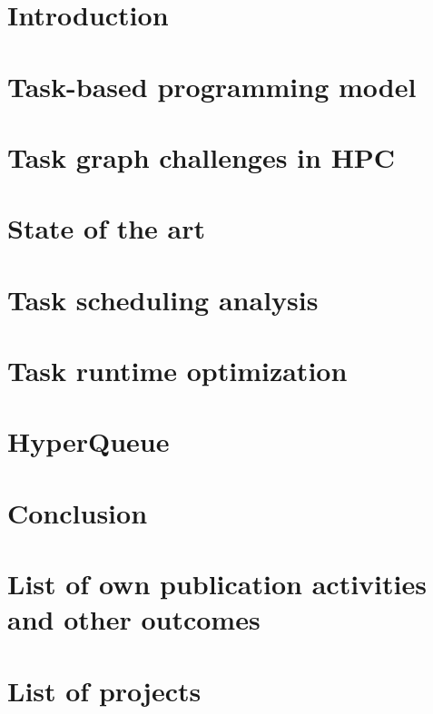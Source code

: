 \documentclass[english,phd]{diploma}
\begin{document}
\MakeTitlePages

\listoffigures
\clearpage

\listoftables
\clearpage

\nocite{estee, rsds, ligate}

\chapter{Introduction}
\label{ch:Introduction}


\chapter{Task-based programming model}
\label{ch:taskgraphs}


\chapter{Task graph challenges in HPC}
\label{ch:challenges}


\chapter{State of the art}
\label{ch:sota}


\chapter{Task scheduling analysis}
\label{ch:estee}


\chapter{Task runtime optimization}
\label{ch:rsds}


\chapter{HyperQueue}
\label{ch:hyperqueue}


\chapter{Conclusion}
\label{ch:conclusion}


\chapter*{List of own publication activities and other outcomes}
\label{ch:listofstudentsownpublicationactivitiesandotheroutcomes}



\chapter*{List of projects}
\label{ch:listofprojects}~


\printbibliography[heading=bibintoc, title={Bibliography}]

\end{document}
